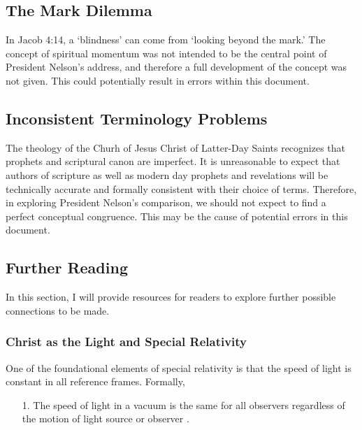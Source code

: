 \documentclass{article}
\begin{document}
            \subsection{The Mark Dilemma}
                In Jacob 4:14, a `blindness' can come from `looking beyond the mark.' The concept of spiritual momentum was not intended to be the central point of President Nelson's address, and therefore a full development of the concept was not given.
                This could potentially result in errors within this document.

            \subsection{Inconsistent Terminology Problems}
                The theology of the Churh of Jesus Christ of Latter-Day Saints recognizes that prophets and scriptural canon are imperfect. 
                It is unreasonable to expect that authors of scripture as well as modern day prophets and revelations will be technically accurate and formally consistent with their choice of terms. 
                Therefore, in exploring President Nelson's comparison, we should not expect to find a perfect conceptual congruence.
                This may be the cause of potential errors in this document.

            \subsection{Further Reading}

                In this section, I will provide resources for readers to explore further possible connections to be made.

                \subsubsection{Christ as the Light and Special Relativity}
                    One of the foundational elements of special relativity is that the speed of light is constant in all reference frames. 
                    Formally, 
                    
                    \begin{enumerate}
                        \item [1.] The speed of light in a vacuum is the same for all observers regardless of the motion of light source or observer \cite{Jackson}.
                    \end{enumerate}
\end{document}
